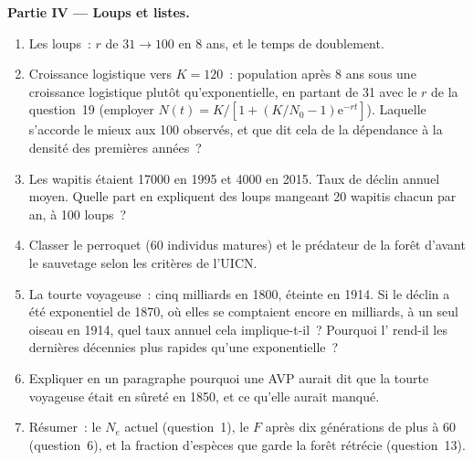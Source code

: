 \begin{problem}
\medskip
\noindent\textbf{Partie IV --- Loups et listes.}
\begin{enumerate}[resume]
  \item Les loups~: $r$ de $31 \to 100$ en 8 ans, et le temps de
        doublement.
  \item Croissance logistique vers $K = 120$~: population après 8 ans
        sous une croissance logistique plutôt qu'exponentielle, en
        partant de 31 avec le $r$ de la question~19 (employer
        $N(t) = K/[1 + (K/N_{0} -
        1)\mathrm{e}^{-rt}]$). Laquelle s'accorde le mieux aux 100
        observés, et que dit cela de la dépendance à la densité des
        premières années~?
  \item Les wapitis étaient \num{17000} en 1995 et \num{4000} en 2015.
        Taux de déclin annuel moyen. Quelle part en expliquent des loups
        mangeant \num{20} wapitis chacun par an, à 100 loups~?
  \item Classer le perroquet (60 individus matures) et le prédateur de
        la forêt d'avant le sauvetage selon les critères de l'UICN.
  \item La tourte voyageuse~: cinq milliards en 1800, éteinte en 1914. Si
        le déclin a été exponentiel de 1870, où elles se comptaient
        encore en milliards, à un seul oiseau en 1914, quel taux annuel
        cela implique-t-il~? Pourquoi l' rend-il les dernières
        décennies plus rapides qu'une exponentielle~?
  \item Expliquer en un paragraphe pourquoi une AVP aurait dit que la
        tourte voyageuse était en sûreté en 1850, et ce qu'elle aurait
        manqué.
  \item Résumer~: le $N_{e}$ actuel (question~1), le $F$ après dix
        générations de plus à 60 (question~6), et la fraction d'espèces
        que garde la forêt rétrécie (question~13).
\end{enumerate}
\end{problem}

